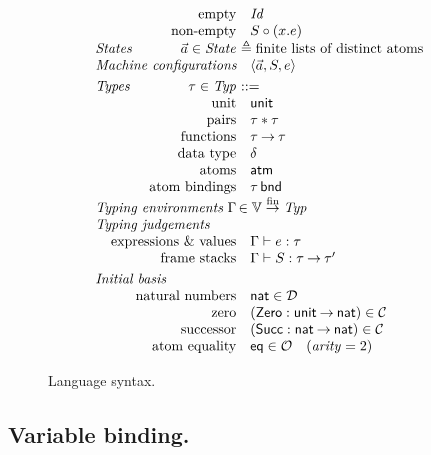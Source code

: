 \documentclass{LMCS}
\theoremstyle{plain}
\theoremstyle{definition}
\newcommand{\arity}{\mathit{arity}}
\newcommand{\ATM}{\kw{atm}}
\newcommand{\BINDTY}{\kw{bnd}}
\newcommand{\comp}{\circ}
\newcommand{\CON}[1][C]{\kw{#1}}
\newcommand{\Con}{\mathcal{C}}
\newcommand{\config}[3]{\langle#1, #2, #3\rangle}
\newcommand{\defeq}{\triangleq}
\newcommand{\dty}{\delta}
\newcommand{\Dty}{\mathcal{D}}
\newcommand{\enty}{\vdash}
\newcommand{\es}{\mathit{Id}}
\renewcommand{\exp}[1][e]{#1}
\newcommand{\fmap}{\stackrel{\mathrm{fin}}{\rightarrow}}
\newcommand{\FUNTY}{\mathbin{\rightarrow}}
\newcommand{\kw}[1]{\mathsf{#1}}
\newcommand{\NAT}{\kw{nat}}
\newcommand{\Obs}{\mathcal{O}}
\newcommand{\OBS}[1][obs]{\kw{#1}}
\newcommand{\ofty}{:}
\newcommand{\OFTY}{\mathrel{\kw{:}}}
\newcommand{\PRODTY}{\mathbin{\kw{*}}}
\newcommand{\State}{\mathit{State}}
\newcommand{\s}[1][a]{\vec{#1}}
\newcommand{\stk}[1][S]{#1}
\newcommand{\ty}{\tau}
\newcommand{\Ty}{\mathit{Typ}}
\newcommand{\UNIT}{\kw{unit}}
\newcommand{\vid}[1][x]{#1}
\newcommand{\Vid}{\mathbb{V}}
\begin{document}
\begin{figure}
\[\begin{array}{lrl}
    &\makebox[0pt][r]{empty} &\es\\
    &\makebox[0pt][r]{non-empty} &\stk\comp(\vid.\exp)\\
    \text{\emph{States}}
    &\s\in\State &\!\!\!\!\defeq \text{finite lists of distinct atoms}\\
    \makebox[0pt][l]{\text{\emph{Machine configurations}}}
    &&\config{\s}{\stk}{\exp}\\[\jot]
    \text{\emph{Types}} 
    &\ty\in\Ty &\!\!\!\!::=\\
    &\makebox[0pt][r]{unit} &\UNIT\\
    &\makebox[0pt][r]{pairs} &\ty\PRODTY\ty\\
    &\makebox[0pt][r]{functions} &\ty\FUNTY\ty\\
    &\makebox[0pt][r]{data type} &\dty\\
    &\makebox[0pt][r]{atoms} &\ATM\\
    &\makebox[0pt][r]{atom bindings} &\ty\,\BINDTY\\
    \makebox[0pt][l]{\text{\emph{Typing environments}}}
    &\Gamma &\!\!\!\!\!\in \Vid\fmap\Ty\\
    \makebox[0pt][l]{\text{\emph{Typing judgements}}} & &\\
    &\makebox[0pt][r]{expressions \& values}
    &\Gamma\enty\exp\ofty\ty\\
    &\makebox[0pt][r]{frame stacks}
    &\Gamma\enty\stk\ofty\ty\FUNTY\ty'\\[\jot]
    \text{\emph{Initial basis}} &&\\
    &\makebox[0pt][r]{natural numbers} &\NAT \in\Dty\\
    &\makebox[0pt][r]{zero} &(\CON[Zero]\OFTY\UNIT\FUNTY\NAT) \in\Con\\
    &\makebox[0pt][r]{successor} &(\CON[Succ]\OFTY\NAT\FUNTY\NAT) \in\Con\\
    &\makebox[0pt][r]{atom equality} & \OBS[eq] \in\Obs\quad (\arity=2)
  \end{array}
  \]
  \caption{Language syntax.}
  \label{fig:lans}
\end{figure}

\subsection*{Variable binding.}
\end{document}
